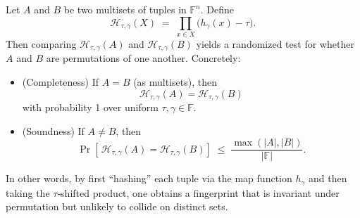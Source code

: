 \documentclass[../../book]{subfiles}
\begin{document}
\begin{definition}
    Let $A$ and $B$ be two multisets of tuples in $\mathbb{F}^n$. Define
    \begin{equation*}
        \mathcal{H}_{\tau,\gamma}(X)\;=\;\prod_{x \in X}\bigl(h_{\gamma}(x)-\tau\bigr).
    \end{equation*}
    Then comparing $\mathcal{H}_{\tau,\gamma}(A)$ and $\mathcal{H}_{\tau,\gamma}(B)$ yields a
    randomized test for whether $A$ and $B$ are permutations of one another. Concretely:
    \begin{itemize}
        \item (Completeness) If $A=B$ (as multisets), then  
            \begin{equation*}
                \mathcal{H}_{\tau,\gamma}(A)=\mathcal{H}_{\tau,\gamma}(B)
            \end{equation*}
            with probability 1 over uniform $\tau,\gamma\in\mathbb{F}$.
        \item (Soundness) If $A\neq B$, then
            \begin{equation*}
                \Pr\left[\,\mathcal{H}_{\tau,\gamma}(A)=\mathcal{H}_{\tau,\gamma}(B)\right]\;\le\; \frac{\max(|A|,|B|)}{|\mathbb{F}|}.
            \end{equation*}
    \end{itemize}
\end{definition}

In other words, by first “hashing” each tuple via the map function $h_{\gamma}$ and then taking the 
$\tau$‐shifted product, one obtains a fingerprint that is invariant under permutation but unlikely 
to collide on distinct sets.
\end{document}
